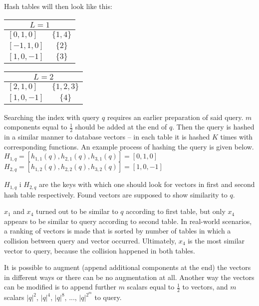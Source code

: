 Hash tables will then look like this:
\begin{center}
\begin{tabular}{|l|c|}
\hline
\multicolumn{2}{|c|}{$L = 1$} \\
\hline
$[0, 1, 0]$ & $\{1, 4\}$ \\
\hline
$[-1, 1, 0]$ & $\{2\}$ \\
\hline
$[1, 0, -1]$ & $\{3\}$ \\
\hline
\end{tabular}
\begin{tabular}{|l|c|}
\hline
\multicolumn{2}{|c|}{$L = 2$} \\
\hline
$[2, 1, 0]$ & $\{1, 2, 3\}$ \\
\hline
$[1, 0, -1]$ & $\{4\}$ \\
\hline
\end{tabular}
\end{center}
Searching the index with query $q$ requires an earlier preparation of said query.
$m$ components equal to $\frac{1}{2}$ should be added at the end of $q$.
Then the query is hashed in a similar manner to database vectors -- in each table it is hashed $K$ times with corresponding functions.
An example process of hashing the query is given below.\\
$H_{1,q} = [h_{1,1}(q), h_{2,1}(q), h_{3,1}(q)] = [0, 1, 0]$\\
$H_{2,q} = [h_{1,2}(q), h_{2,2}(q), h_{3,2}(q)] = [1, 0, -1]$

$H_{1,q}$ i $H_{2,q}$ are the keys with which one should look for vectors in first and second hash table respectively.
Found vectors are supposed to show similarity to $q$.
\par
$x_1$ and $x_4$ turned out to be similar to $q$ according to first table, but only $x_4$ appears to be similar to query according to second table.
In real-world scenarios, a ranking of vectors is made that is sorted by number of tables in which a collision between query and vector occurred.
Ultimately, $x_4$ is the most similar vector to query, because the collision happened in both tables.
\par
It is possible to augment (append additional components at the end) the vectors in different ways or there can be no augmentation at all.
Another way the vectors can be modified is to append further $m$ scalars equal to $\frac{1}{2}$ to vectors, and $m$ scalars $|q|^2$, $|q|^4$, $|q|^8$, $...$, $|q|^{2^m}$ to query.
